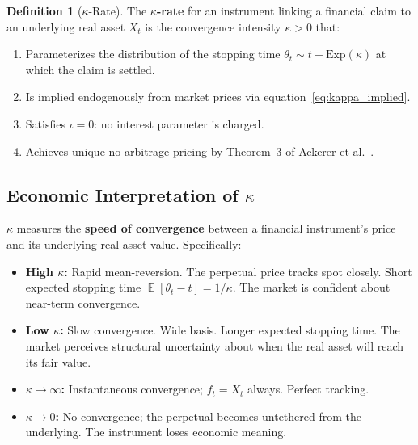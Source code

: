 \documentclass[10pt,twocolumn]{article}
\theoremstyle{plain}
\theoremstyle{definition}
\newtheorem{definition}{Definition}
\DeclareMathOperator{\E}{\mathbb{E}}
\begin{document}
\begin{definition}[$\kappa$-Rate]
\label{def:kappa}
The \textbf{$\kappa$-rate} for an instrument linking a financial
claim to an underlying real asset $X_t$ is the convergence
intensity $\kappa > 0$ that:
\begin{enumerate}[leftmargin=*,noitemsep]
\item Parameterizes the distribution of the stopping time $\theta_t
\sim t + \mathrm{Exp}(\kappa)$ at which the claim is settled.
\item Is implied endogenously from market prices via
equation~\eqref{eq:kappa_implied}.
\item Satisfies $\iota = 0$: no interest parameter is charged.
\item Achieves unique no-arbitrage pricing by Theorem~3 of
Ackerer et al.\ \cite{Ackerer2024}.
\end{enumerate}
\end{definition}

\subsection{Economic Interpretation of $\kappa$}

$\kappa$ measures the \textbf{speed of convergence} between a
financial instrument's price and its underlying real asset value.
Specifically:
\begin{itemize}[leftmargin=*,noitemsep]
\item \textbf{High $\kappa$:} Rapid mean-reversion. The perpetual
price tracks spot closely. Short expected stopping time
$\E[\theta_t - t] = 1/\kappa$. The market is confident about
near-term convergence.
\item \textbf{Low $\kappa$:} Slow convergence. Wide basis.
Longer expected stopping time. The market perceives structural
uncertainty about when the real asset will reach its fair value.
\item \textbf{$\kappa \to \infty$:} Instantaneous convergence;
$f_t = X_t$ always. Perfect tracking.
\item \textbf{$\kappa \to 0$:} No convergence; the perpetual
becomes untethered from the underlying. The instrument loses
economic meaning.
\end{itemize}
\end{document}
